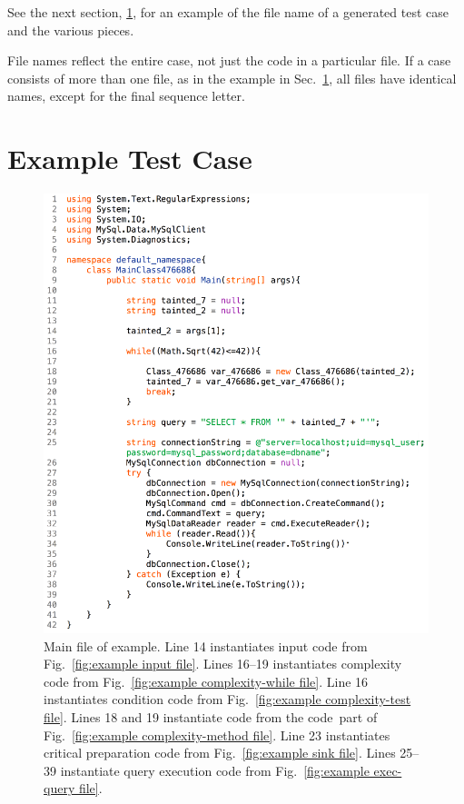 \documentclass[12pt]{article}
\begin{document}
See the next section, \ref{sec:generated files}, for an example of the file name of a
generated test case and the various pieces.

File names reflect the entire case, not just the code in a 
particular file.  If a case consists of more than one file, as in the
example in Sec.~\ref{sec:generated files}, all files have
identical names, except for the final sequence letter.

\section{Example Test Case}
\label{sec:generated files}

\begin{figure}[htbp]
  \includegraphics[width=\linewidth]{fig_example_code1.png}
  \caption{Main file of example. Line 14 instantiates input code from 
    Fig.~\ref{fig:example input file}. Lines 16--19 instantiates complexity code from 
    Fig.~\ref{fig:example complexity-while file}. Line 16 instantiates condition code from
    Fig.~\ref{fig:example complexity-test file}.  Lines 18 and 19 instantiate code from the
    \texlangle code\texrangle\  part of Fig.~\ref{fig:example complexity-method file}.
    Line 23 instantiates critical preparation code from Fig.~\ref{fig:example sink file}.
    Lines 25--39 instantiate query execution code from Fig.~\ref{fig:example exec-query file}.
  }
  \label{fig:example main file}
\end{figure}
\end{document}
